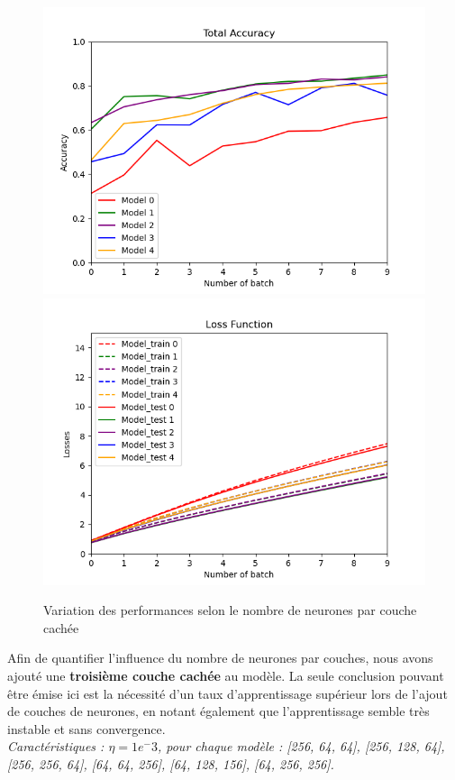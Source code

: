 \documentclass[a4paper]{article}
\begin{document}
		\begin{figure}[!ht]
			\centering
			\includegraphics[width=.5\textwidth]{Fig_acc_p3_nb_neurons.png}\hfill
			\includegraphics[width=.5\textwidth]{Fig_losses_p3_nb_neurons.png}\hfill
			\caption{Variation des performances selon le nombre de neurones par couche cachée}	
		\end{figure}


Afin de quantifier l'influence du nombre de neurones par couches, nous avons ajouté une \textbf{troisième couche cachée} au modèle. La seule conclusion pouvant être émise ici est la nécessité d'un taux d'apprentissage supérieur lors de l'ajout de couches de neurones, en notant également que l'apprentissage semble très instable et sans convergence.\\

\textit{Caractéristiques : $\eta = 1e^-3$, pour chaque modèle : [256, 64, 64], [256, 128, 64], [256, 256, 64], [64, 64, 256], [64, 128, 156], [64, 256, 256].}
\end{document}

